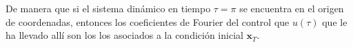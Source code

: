 De manera que si el sistema dinámico en tiempo $\tau = \pi$ se encuentra en el origen de coordenadas, entonces los coeficientes de Fourier del control que $u(\tau)$ que le ha llevado allí son los los asociados a la condición inicial $\bm{x}_T$. 
